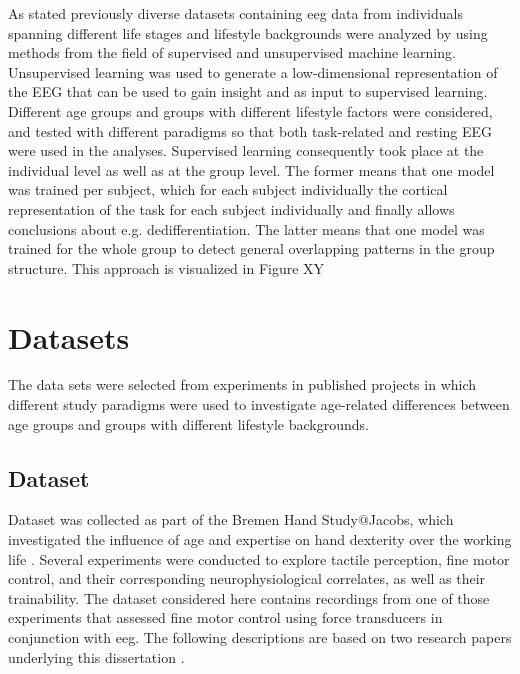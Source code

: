 As stated previously diverse datasets containing \gls{eeg} data from individuals spanning different life stages and lifestyle backgrounds were analyzed by using methods from the field of supervised and unsupervised machine learning. Unsupervised learning was used to generate a low-dimensional representation of the EEG that can be used to gain insight and as input to supervised learning. Different age groups and groups with different lifestyle factors were considered, and tested with different paradigms so that both task-related and resting EEG were used in the analyses. Supervised learning consequently took place at the individual level as well as at the group level. The former means that one model was trained per subject, which for each subject individually the cortical representation of the task for each subject individually and finally allows conclusions about e.g. dedifferentiation. The latter means that one model was trained for the whole group to detect general overlapping patterns in the group structure. This approach is visualized in Figure XY

\section{Datasets}
The data sets were selected from experiments in published projects in which different study paradigms were used to investigate age-related differences between age groups and groups with different lifestyle backgrounds.

\subsection{Dataset }
Dataset  was collected as part of the Bremen Hand Study@Jacobs, which investigated the influence of age and expertise on hand dexterity over the working life \cite{Voelcker-Rehage2013}. Several experiments were conducted to explore tactile perception, fine motor control, and their corresponding neurophysiological correlates, as well as their trainability. The dataset considered here contains recordings from one of those experiments that assessed fine motor control using force transducers in conjunction with \gls{eeg}. The following descriptions are based on two research papers underlying this dissertation \cite{Gaidai2022, Goelz2021a}.

